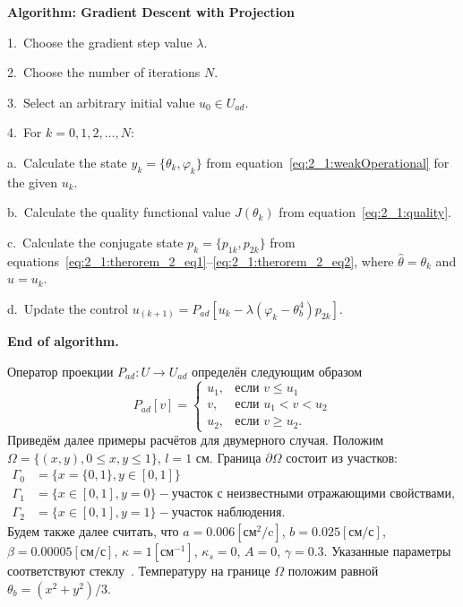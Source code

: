 \textbf{Algorithm: Gradient Descent with Projection}

1.\ Choose the gradient step value $\lambda$.

2.\ Choose the number of iterations $N$.

3.\ Select an arbitrary initial value $u_0 \in U_{ad}$.

4.\ For $k = 0, 1, 2, \dots, N$:

\hspace{1cm} a.\ Calculate the state $y_k = \{\theta_k, \varphi_k\}$
from equation~\eqref{eq:2_1:weakOperational} for the given $u_k$.

\hspace{1cm} b.\ Calculate the quality functional value
$J(\theta_k)$ from equation~\eqref{eq:2_1:quality}.

\hspace{1cm} c.\ Calculate the conjugate state $p_k = \{p_{1k}, p_{2k}\}$
from equations~\eqref{eq:2_1:therorem_2_eq1}--\eqref{eq:2_1:therorem_2_eq2},
where $\hat{\theta} = \theta_k$ and $\hat{u} = u_k$.

\hspace{1cm} d.\ Update the control $u_{(k+1)} = P_{ad} [ u_k -
\lambda(\varphi_k - \theta_b^4) p_{2k} ]$.

\textbf{End of algorithm.}

Оператор проекции $P_{ad} : U \to U_{ad}$ определён следующим образом
\[
    P_{ad}[v] =
    \begin{cases}
        u_1, & \text{если } v \le u_1 \\
        v, & \text{если } u_1 < v < u_2 \\
        u_2, & \text{если } v \ge u_2.
    \end{cases}
\]
Приведём далее примеры расчётов для двумерного случая.
Положим $\Omega = \{(x,y), 0 \leq x,y \leq 1\}$, $l = 1$ см.
Граница $\partial\Omega$ состоит из участков:
\[
    \begin{aligned}
        \Gamma_0 & = \{x=\{0,1\}, y \in [0,1]\} \\
        \Gamma_1 & = \{x\in [0,1], y=0\}
        - \text{участок с неизвестными отражающими свойствами}, \\
        \Gamma_2 & = \{x \in [0,1], y=1\} - \text{участок наблюдения}.
    \end{aligned}
\]
Будем также далее считать, что $a = 0.006[\text{см}^2/\text{c}]$,
$b=0.025[\text{см}/\text{с}]$, $\beta = 0.00005[\text{см}/\text{с}]$,
$\kappa=1[\text{см}^{-1}]$, $\kappa_s = 0$, $A = 0$, $\gamma = 0.3$.
Указанные параметры соответствуют стеклу~\cite{Grenkin2016a}.
Температуру на границе $\Omega$ положим равной $\theta_b = (x^2+y^2)/3$.

